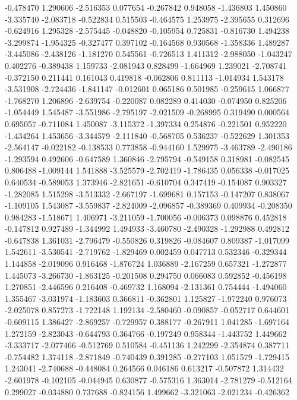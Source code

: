 -0.478470
1.290606
-2.516353
0.077654
-0.267842
0.948058
-1.436803
1.450860
-3.335740
-2.083718
-0.522834
0.515503
-0.464575
1.253975
-2.395655
0.312696
-0.624916
1.295328
-2.575445
-0.048820
-0.105954
0.725831
-0.816730
1.494238
-3.299874
-1.954325
-0.327477
0.397102
-0.164568
0.930568
-1.358336
1.489287
-3.445086
-2.438126
-1.181270
0.545561
-0.726513
1.411312
-2.988050
-1.043247
0.402276
-0.389438
1.159733
-2.081943
0.828499
-1.664969
1.239021
-2.708741
-0.372150
0.211441
0.161043
0.419818
-0.062806
0.811113
-1.014934
1.543178
-3.531908
-2.724436
-1.841147
-0.012601
0.065186
0.501985
-0.259615
1.066877
-1.768270
1.206896
-2.639754
-0.220087
0.082289
0.414030
-0.074950
0.825206
-1.054449
1.545487
-3.551986
-2.795197
-2.021509
-0.268995
0.319490
0.000564
0.695057
-0.711084
1.450087
-3.115372
-1.397334
0.254876
-0.221501
0.952220
-1.434264
1.453656
-3.344579
-2.111840
-0.568705
0.536237
-0.522629
1.301353
-2.564147
-0.022182
-0.138533
0.773858
-0.944160
1.529975
-3.463789
-2.490186
-1.293594
0.492606
-0.647589
1.360846
-2.795794
-0.549158
0.318981
-0.082545
0.806488
-1.009144
1.541888
-3.525579
-2.702419
-1.786435
0.056338
-0.017025
0.640534
-0.589053
1.373946
-2.821651
-0.610704
0.347419
-0.154087
0.903327
-1.282085
1.515298
-3.513332
-2.667197
-1.699681
0.157153
-0.147207
0.838067
-1.109105
1.543087
-3.559837
-2.824009
-2.096857
-0.389369
0.409934
-0.208350
0.984283
-1.518671
1.406971
-3.211059
-1.700056
-0.006373
0.098876
0.452818
-0.147812
0.927489
-1.344992
1.494933
-3.460780
-2.490328
-1.292988
0.492812
-0.647838
1.361031
-2.796479
-0.550826
0.319826
-0.084607
0.809387
-1.017099
1.542611
-3.530541
-2.719762
-1.829469
0.002459
0.047713
0.532346
-0.329344
1.144858
-2.019096
0.916468
-1.876724
1.036889
-2.167259
0.657321
-1.272877
1.445073
-3.266730
-1.863125
-0.201508
0.294750
0.066083
0.592852
-0.456198
1.270851
-2.446596
0.216408
-0.469732
1.168094
-2.131361
0.754444
-1.494060
1.355467
-3.031974
-1.183603
0.366811
-0.362801
1.125827
-1.972240
0.976073
-2.025078
0.857273
-1.722148
1.192134
-2.580460
-0.090857
-0.052717
0.644601
-0.609115
1.386427
-2.869257
-0.729957
0.388177
-0.267911
1.041285
-1.697164
1.272159
-2.823043
-0.644793
0.364766
-0.197249
0.958344
-1.443752
1.449662
-3.333717
-2.077466
-0.512769
0.510584
-0.451136
1.242299
-2.354874
0.387711
-0.754482
1.374118
-2.871849
-0.740439
0.391285
-0.277103
1.051579
-1.729415
1.243041
-2.740688
-0.448084
0.264566
0.046186
0.613217
-0.507872
1.314432
-2.601978
-0.102105
-0.044945
0.630877
-0.575316
1.363014
-2.781279
-0.512164
0.299027
-0.034880
0.737688
-0.824156
1.499662
-3.321063
-2.021234
-0.426362
